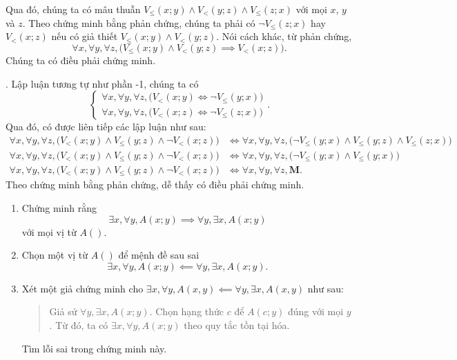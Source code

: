 Qua đó, chúng ta có mâu thuẫn $V_\le(x; y) \land V_<(y; z) \land V_\le(z; x)$ với mọi $x$, $y$ và $z$. Theo chứng minh bằng phản chứng, chúng ta phải có $\neg V_\le(z; x)$ hay $V_<(x; z)$ nếu có giả thiết $V_\le(x; y) \land V_<(y; z)$. Nói cách khác, từ phản chứng,
$$
    \forall x, \forall y, \forall z, \big(V_\le(x; y) \land V_<(y; z) \implies V_<(x; z)\big).
$$
Chúng ta có điều phải chứng minh.

. Lập luận tương tự như phần \the\numexpr\value{subexercise}-1\relax, chúng ta có
$$
    \begin{cases}
        \forall x, \forall y, \forall z, \big(V_<(x; y) \iff \neg V_\le(y; x)\big) \\
        \forall x, \forall y, \forall z, \big(V_<(x; z) \iff \neg V_\le(z; x)\big)
    \end{cases}.
$$
Qua đó, có được liên tiếp các lập luận như sau:
\begin{align*}
    \forall x, \forall y, \forall z, \big(V_<(x; y) \land V_\le(y; z) \land \neg V_<(x; z)\big) &\iff \forall x, \forall y, \forall z, \big(\neg V_\le(y; x) \land V_\le(y; z) \land V_\le(z; x)\big) \\
    \forall x, \forall y, \forall z, \big(V_<(x; y) \land V_\le(y; z) \land \neg V_<(x; z)\big) &\iff \forall x, \forall y, \forall z, \big(\neg V_\le(y; x) \land V_\le(y; x)\big) \\
    \forall x, \forall y, \forall z, \big(V_<(x; y) \land V_\le(y; z) \land \neg V_<(x; z)\big) &\iff \forall x, \forall y, \forall z, \mathbf{M}.
\end{align*}
Theo chứng minh bằng phản chứng, dễ thấy có điều phải chứng minh.

\exercise 
\begin{enumerate}
   \item Chứng minh rằng \begin{equation*}
      \exists x, \forall y, A(x; y) \implies \forall y, \exists x, A(x; y)
   \end{equation*}
   với mọi vị từ $A()$.
   \item Chọn một vị từ $A()$ để mệnh đề sau sai
   \begin{equation*}
      \exists x, \forall y, A(x; y) \impliedby \forall y, \exists x, A(x; y).
   \end{equation*}
   \item Xét một giả chứng minh cho $\exists x, \forall y, A(x, y) \impliedby \forall y, \exists x, A(x, y)$ như sau: \begin{quotation}
      Giả sử $\forall y, \exists x, A(x; y)$. Chọn hạng thức $c$ để $A(c; y)$ đúng với mọi $y$. Từ đó, ta có $\exists x, \forall y, A(x; y)$ theo quy tắc tồn tại hóa.
   \end{quotation}
   Tìm lỗi sai trong chứng minh này.
\end{enumerate}

